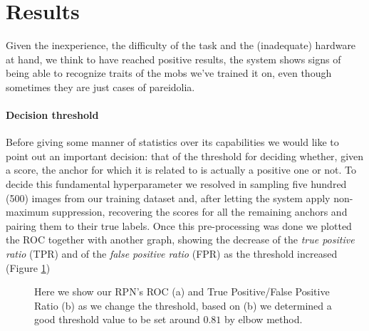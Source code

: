 \documentclass[10pt,journal,cspaper,compsoc]{IEEEtran}
\begin{document}
    \section{Results}
    Given the inexperience, the difficulty of the task and the (inadequate) hardware at hand, we think to have reached positive results, the system shows signs of being able to recognize traits of the mobs we've trained it on, even though sometimes they are just cases of pareidolia.
    \paragraph*{Decision threshold} Before giving some manner of statistics over its capabilities we would like to point out an important decision: that of the threshold for deciding whether, given a score, the anchor for which it is related to is actually a positive one or not. To decide this fundamental hyperparameter we resolved in sampling five hundred (500) images from our training dataset and, after letting the system apply non-maximum suppression, recovering the scores for all the remaining anchors and pairing them to their true labels. Once this pre-processing was done we plotted the ROC together with another graph, showing the decrease of the \emph{true positive ratio} (TPR) and of the \emph{false positive ratio} (FPR) as the threshold increased (Figure \ref*{fig:ROCs})

    \begin{figure}[tb]
        \centering
         \hfill
        \caption{Here we show our RPN's ROC (a) and True Positive/False Positive Ratio (b) as we change the threshold, based on (b) we determined a good threshold value to be set around $0.81$ by elbow method.}
        \label{fig:ROCs}
    \end{figure}
\end{document}
